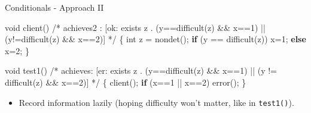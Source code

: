 \documentclass[
  10pt,
  ignorenonframetext,
]{beamer}
\newenvironment{Shaded}{\begin{snugshade}}{\end{snugshade}}
\newcommand{\CommentTok}[1]{\textcolor[rgb]{0.48,0.49,0.49}{#1}}
\newcommand{\ControlFlowTok}[1]{\textcolor[rgb]{0.99,0.74,0.29}{\textbf{#1}}}
\newcommand{\DataTypeTok}[1]{\textcolor[rgb]{0.16,0.50,0.73}{#1}}
\newcommand{\DecValTok}[1]{\textcolor[rgb]{0.96,0.45,0.00}{#1}}
\newcommand{\NormalTok}[1]{\textcolor[rgb]{0.81,0.81,0.76}{#1}}
\newcommand{\OperatorTok}[1]{\textcolor[rgb]{0.81,0.81,0.76}{#1}}
\providecommand{\tightlist}{%
  \setlength{\itemsep}{0pt}\setlength{\parskip}{0pt}}
\begin{document}
\begin{frame}[fragile]{Conditionals - Approach II}
\label{conditionals---approach-ii}
\begin{Shaded}
\begin{Highlighting}[]
\DataTypeTok{void}\NormalTok{ client}\OperatorTok{()}
\CommentTok{/* achieves2 : [ok: exists z . (y==difficult(z) \&\& x==1)}
\CommentTok{    || (y!=difficult(z) \&\& x==2)] */}
\OperatorTok{\{}   \DataTypeTok{int}\NormalTok{ z }\OperatorTok{=}\NormalTok{ nondet}\OperatorTok{();}
    \ControlFlowTok{if} \OperatorTok{(}\NormalTok{y }\OperatorTok{==}\NormalTok{ difficult}\OperatorTok{(}\NormalTok{z}\OperatorTok{))}
\NormalTok{        x}\OperatorTok{=}\DecValTok{1}\OperatorTok{;}
    \ControlFlowTok{else}
\NormalTok{        x}\OperatorTok{=}\DecValTok{2}\OperatorTok{;}
\OperatorTok{\}}

\DataTypeTok{void}\NormalTok{ test1}\OperatorTok{()}
\CommentTok{/* achieves: [er: exists z .}
\CommentTok{    (y==difficult(z) \&\& x==1)}
\CommentTok{    || (y != difficult(z) \&\& x==2)] */}
\OperatorTok{\{}\NormalTok{   client}\OperatorTok{();} \ControlFlowTok{if} \OperatorTok{(}\NormalTok{x}\OperatorTok{==}\DecValTok{1} \OperatorTok{||}\NormalTok{ x}\OperatorTok{==}\DecValTok{2}\OperatorTok{)}\NormalTok{ error}\OperatorTok{();}
\OperatorTok{\}}
\end{Highlighting}
\end{Shaded}

\begin{itemize}
\tightlist
\item
  Record information lazily (hoping difficulty won't matter, like in
  \texttt{test1()}).
\end{itemize}
\end{frame}
\end{document}
